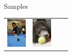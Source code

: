 \documentclass{beamer}
\newcommand{\samplesheight}{1.5cm}
\begin{document}
\begin{frame}{Samples}
\begin{table}[H]
\begin{tabularx}{\textwidth}{@{}cccc@{}}
			\includegraphics[height=\samplesheight]{training_images/positive/n03145719_8658} &
			\includegraphics[height=\samplesheight]{training_images/positive/n04409515_2793} \\

\end{tabularx}
\end{table}
\end{frame}
\end{document}
